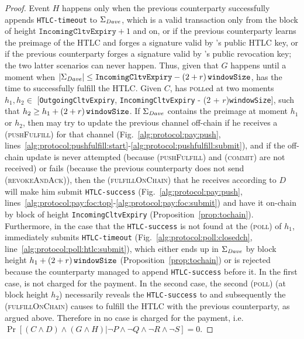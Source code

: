\begin{proof}
  Event $H$ happens only when the previous counterparty successfully appends
  \texttt{HTLC-timeout} to $\Sigma_{\mathit{Dave}}$, which is a valid transaction only
  from the block of height $\mathtt{IncomingCltvExpiry} + 1$ and on, or if the
  previous counterparty learns the preimage of the HTLC and forges a signature
  valid by \dave's public HTLC key, or if the previous counterparty forges a
  signature valid by \dave's public revocation key; the two latter scenarios can
  never happen. Thus, given that $G$ happens until a moment when
  $|\Sigma_{\mathit{Dave}}| \leq \mathtt{IncomingCltvExpiry} - \left(2 + r\right)\texttt{windowSize}{}$, \dave{} has
  the time to successfully fulfill the HTLC. Given $C$, \dave{} has
  \textsc{poll}ed at two moments $h_1, h_2 \in$ [\texttt{OutgoingCltvExpiry},
  \texttt{IncomingCltvExpiry} - (2 + $r$)\texttt{windowSize}], such that $h_2
  \geq h_1 + \left(2 + r\right)\texttt{windowSize}{}$. If $\Sigma_{\mathit{Dave}}$ contains the preimage at moment
  $h_1$ or $h_2$, then \dave{} may try to update the previous channel off-chain
  if he receives a (\textsc{pushFulfill}) for that channel
  (Fig.~\ref{alg:protocol:pay:push},
  lines~\ref{alg:protocol:pushfulfill:start}-\ref{alg:protocol:pushfulfill:submit}),
  and if the off-chain update is never attempted (because (\textsc{pushFulfill})
  and (\textsc{commit}) are not received) or fails (because the previous
  counterparty does not send (\textsc{revokeAndAck})), then the
  (\textsc{fulfillOnChain}) that he receives according to $D$ will make him
  submit \texttt{HTLC-success} (Fig.~\ref{alg:protocol:pay:push},
  lines~\ref{alg:protocol:pay:foc:top}-\ref{alg:protocol:pay:foc:submit}) and
  have it on-chain by block of height \texttt{IncomingCltvExpiry}
  (Proposition~\ref{prop:tochain}). Furthermore, in the case that the
  \texttt{HTLC-success} is not found at the (\textsc{poll}) of $h_1$, \dave{}
  immediately submits \texttt{HTLC-timeout}
  (Fig.~\ref{alg:protocol:poll:closedch},
  line~\ref{alg:protocol:poll:htlc:submit}), which either ends up in
  $\Sigma_{\mathit{Dave}}$ by block height $h_1 + \left(2 + r\right)\texttt{windowSize}{}$
  (Proposition~\ref{prop:tochain}) or is rejected because the counterparty
  managed to append \texttt{HTLC-success} before it. In the first case, \dave{}
  is not charged for the payment. In the second case, the second (\textsc{poll})
  (at block height $h_2$) necessarily reveals the \texttt{HTLC-success} to
  \dave{} and subsequently the (\textsc{fulfillOnChain}) causes \dave{} to
  fulfill the HTLC with the previous counterparty, as argued above. Therefore in
  no case \dave{} is charged for the payment, i.e. $\Pr[(C \wedge D) \wedge (G
  \wedge H) | \neg P \wedge \neg Q \wedge \neg R \wedge \neg S] = 0$.


\end{proof}
